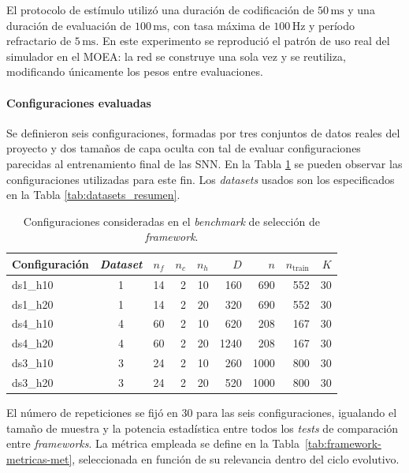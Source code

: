 El protocolo de estímulo utilizó una duración de codificación de \(50\,\mathrm{ms}\) y una duración de evaluación de \(100\,\mathrm{ms}\), con tasa máxima de \(100\,\mathrm{Hz}\) y período refractario de \(5\,\mathrm{ms}\). En este experimento se reprodució el patrón de uso real del simulador en el MOEA: la red se construye una sola vez y se reutiliza, modificando únicamente los pesos entre evaluaciones.

\paragraph{Configuraciones evaluadas}

Se definieron seis configuraciones, formadas por tres conjuntos de datos reales del proyecto y dos tamaños de capa oculta con tal de evaluar configuraciones parecidas al entrenamiento final de las SNN. En la Tabla \ref{tab:framework-configuraciones-met} se pueden observar las configuraciones utilizadas para este fin. Los \textit{datasets} usados son los especificados en la Tabla \ref{tab:datasets_resumen}.

\begin{table}[htbp]
\centering
\caption{Configuraciones consideradas en el \textit{benchmark} de selección de \textit{framework}.}
\label{tab:framework-configuraciones-met}
\small
\begin{tabular}{lcrrrrrrr}
\toprule
Configuración & \textit{Dataset} & $n_f$ & $n_c$ & $n_h$ & $D$ & $n$ & $n_{\mathrm{train}}$ & $K$ \\
\midrule
ds1\_h10 & 1 & 14 & 2 & 10 & 160  &  690 & 552 & 30 \\
ds1\_h20 & 1 & 14 & 2 & 20 & 320  &  690 & 552 & 30 \\
ds4\_h10 & 4 & 60 & 2 & 10 & 620  &  208 & 167 & 30 \\
ds4\_h20 & 4 & 60 & 2 & 20 & 1240 &  208 & 167 & 30 \\
ds3\_h10 & 3 & 24 & 2 & 10 & 260  & 1000 & 800 & 30 \\
ds3\_h20 & 3 & 24 & 2 & 20 & 520  & 1000 & 800 & 30 \\
\bottomrule
\end{tabular}
\end{table}

El número de repeticiones se fijó en 30 para las seis configuraciones, igualando el tamaño de muestra y la potencia estadística entre todos los \textit{tests} de comparación entre \textit{frameworks}. La métrica empleada se define en la Tabla~\ref{tab:framework-metricas-met}, seleccionada en función de su relevancia dentro del ciclo evolutivo.

